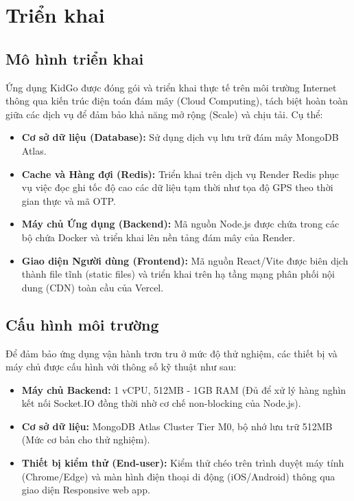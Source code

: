 \documentclass[../DoAn.tex]{subfiles}
\begin{document}
\newpage
\section{Triển khai}
\subsection{Mô hình triển khai}
Ứng dụng KidGo được đóng gói và triển khai thực tế trên môi trường Internet thông qua kiến trúc điện toán đám mây (Cloud Computing), tách biệt hoàn toàn giữa các dịch vụ để đảm bảo khả năng mở rộng (Scale) và chịu tải. Cụ thể:
\begin{itemize}
    \item \textbf{Cơ sở dữ liệu (Database):} Sử dụng dịch vụ lưu trữ đám mây MongoDB Atlas.
    \item \textbf{Cache và Hàng đợi (Redis):} Triển khai trên dịch vụ Render Redis phục vụ việc đọc ghi tốc độ cao các dữ liệu tạm thời như tọa độ GPS theo thời gian thực và mã OTP.
    \item \textbf{Máy chủ Ứng dụng (Backend):} Mã nguồn Node.js được chứa trong các bộ chứa Docker và triển khai lên nền tảng đám mây của Render.
    \item \textbf{Giao diện Người dùng (Frontend):} Mã nguồn React/Vite được biên dịch thành file tĩnh (static files) và triển khai trên hạ tầng mạng phân phối nội dung (CDN) toàn cầu của Vercel.
\end{itemize}
\subsection{Cấu hình môi trường}
Để đảm bảo ứng dụng vận hành trơn tru ở mức độ thử nghiệm, các thiết bị và máy chủ được cấu hình với thông số kỹ thuật như sau:
\begin{itemize}
    \item \textbf{Máy chủ Backend:} 1 vCPU, 512MB - 1GB RAM (Đủ để xử lý hàng nghìn kết nối Socket.IO đồng thời nhờ cơ chế non-blocking của Node.js).
    \item \textbf{Cơ sở dữ liệu:} MongoDB Atlas Cluster Tier M0, bộ nhớ lưu trữ 512MB (Mức cơ bản cho thử nghiệm).
    \item \textbf{Thiết bị kiểm thử (End-user):} Kiểm thử chéo trên trình duyệt máy tính (Chrome/Edge) và màn hình điện thoại di động (iOS/Android) thông qua giao diện Responsive web app.
\end{itemize}
\end{document}
